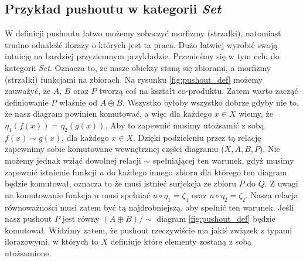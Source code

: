 \subsection{Przykład pushoutu w kategorii \emph{Set}}
W definicji pushoutu łatwo możemy zobaczyć morfizmy (strzałki), natomiast trudno odnaleźć ilorazy o których jest ta praca. Dużo łatwiej wyrobić swoją intuicję na bardziej przyziemnym przykładzie. Przenieśmy się w tym celu do kategorii \emph{Set}. Oznacza to, że nasze obiekty staną się zbiorami, a morfizmy (strzałki) funkcjami na zbiorach. Na rysunku \ref{fig:pushout_def} możemy zauważyć, że $A$, $B$ oraz $P$ tworzą coś na kształt co-produktu. Zatem warto zacząć definiowanie $P$ właśnie od $A \oplus B$. Wszystko byłoby wszystko dobrze gdyby nie to, że nasz diagram powinien komutować, a więc dla każdego $x \in X$ wiemy, że $\eta_1(f(x)) = \eta_2(g(x))$. Aby to zapewnić musimy utożsamić z sobą $f(x) \sim g(x)$, dla każdego $x \in X$. Dzięki podzieleniu przez tą relację zapewnimy sobie komutowane wewnętrznej części diagramu ($X, A, B, P$). Nie możemy jednak wziąć dowolnej relacji $\sim$ spełniającej ten warunek, gdyż musimy zapewnić istnienie funkcji $u$ do każdego innego zbioru dla którego ten diagram będzie komutował, oznacza to że musi istnieć surjekcja ze zbioru $P$ do $Q$. Z uwagi na komutowanie funkcja $u$ musi spełniać $u \circ \eta_1 = \zeta_1$ oraz $u \circ \eta_2 = \zeta_2$. Nasza relacja równoważności musi zatem być tą najdrobniejszą, aby spełnić ten warunek. Jeśli nasz pushout $P$ jest równy $(A \oplus B) / \sim$ diagram \ref{fig:pushout_def} będzie komutował.  Widzimy zatem, że pushout rzeczywiście ma jakiś związek z typami ilorazowymi, w których to $X$ definiuje które elementy zostaną z sobą utożsamione. 
